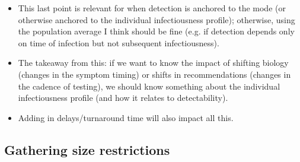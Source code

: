 \begin{itemize}
	\item This last point is relevant for when detection is anchored to the mode (or otherwise anchored to the individual infectiousness profile); otherwise, using the population average I think should be fine (e.g. if detection depends only on time of infection but not subsequent infectiousness). 
	\item The takeaway from this: if we want to know the impact of shifting biology (changes in the symptom timing) or shifts in recommendations (changes in the cadence of testing), we should know something about the individual infectiousness profile (and how it relates to detectability). 
	\item Adding in delays/turnaround time will also impact all this. 
\end{itemize}


\subsection{Gathering size restrictions}

